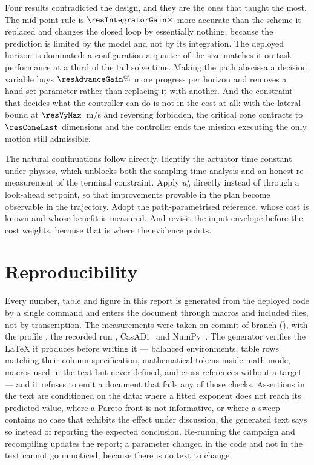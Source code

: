 \documentclass[11pt,a4paper]{article}
\begin{document}
Four results contradicted the design, and they are the ones that taught the most. The mid-point rule is
$\resIntegratorGain\times$ more accurate than the scheme it replaced and changes the closed loop by
essentially nothing, because the prediction is limited by the model and not by its integration. The deployed
horizon is dominated: a configuration a quarter of the size matches it on task performance at a third of the
tail solve time. Making the path abscissa a decision variable buys $\resAdvanceGain\%$ more progress per
horizon and removes a hand-set parameter rather than replacing it with another. And the constraint that
decides what the controller can do is not in the cost at all: with the lateral bound at $\resVyMax$~m/s and
reversing forbidden, the critical cone contracts to $\resConeLast$ dimensions and the controller ends the
mission executing the only motion still admissible.

The natural continuations follow directly. Identify the actuator time constant under physics, which unblocks
both the sampling-time analysis and an honest re-measurement of the terminal constraint. Apply $u^\star_0$
directly instead of through a look-ahead setpoint, so that improvements provable in the plan become
observable in the trajectory. Adopt the path-parametrised reference, whose cost is known and whose benefit is
measured. And revisit the input envelope before the cost weights, because that is where the evidence points.

\section*{Reproducibility}

Every number, table and figure in this report is generated from the deployed code by a single command and
enters the document through macros and included files, not by transcription. The measurements were taken on
commit \texttt{\resCommit} of branch \texttt{\resBranch} (\resDate), with the profile \resProfile{}, the
recorded run \resBag, CasADi~\resCasadi{} and NumPy~\resNumpy. The generator verifies the LaTeX it produces
before writing it --- balanced environments, table rows matching their column specification, mathematical
tokens inside math mode, macros used in the text but never defined, and cross-references without a target ---
and it refuses to emit a document that fails any of those checks. Assertions in the text are conditioned on
the data: where a fitted exponent does not reach its predicted value, where a Pareto front is not
informative, or where a sweep contains no case that exhibits the effect under discussion, the generated text
says so instead of reporting the expected conclusion. Re-running the campaign and recompiling updates the
report; a parameter changed in the code and not in the text cannot go unnoticed, because there is no text to
change.


\end{document}
